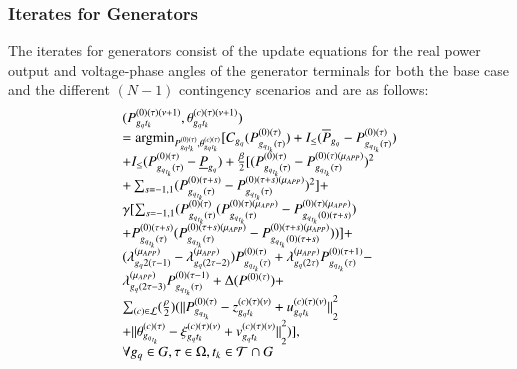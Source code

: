 \documentclass[preprint,12pt,3p]{elsarticle}
\begin{document}
	\subsubsection{Iterates for Generators}The iterates for generators consist of the update equations for the real power output and voltage-phase angles of the generator terminals for both the base case and the different $(N-1)$ contingency scenarios and are as follows:
	\begin{equation}\label{ADMM_Lookahead_Demand_Gen}
	\begin{array}{ll}
	(P_{{g_q}{t_k}}^{(0)(\tau)(\nu+1)},\theta_{{g_q}{t_k}}^{(c)(\tau)(\nu+1)})\\=\mbox{argmin}_{P_{{g_q}{t_k}}^{(0)(\tau)},\theta_{{g_q}{t_k}}^{(c)(\tau)}}[C_{g_q}({P}_{{g_q}_{t_k}(\tau)}^{(0)(\tau)})+I_{\leq}(\overline{P}_{g_q}-{P}_{{g_q}_{t_k}(\tau)}^{(0)(\tau)})
	\notag\\+I_{\leq}({P}_{{g_q}_{t_k}(\tau)}^{(0)(\tau)}-\underline{P}_{g_q})+\frac{\beta}{2}[({P}_{{g_q}_{t_k}(\tau)}^{(0)(\tau)}-{P}_{{g_q}_{t_k}(\tau)}^{(0)(\tau)(\mu_{APP})})^2\notag\\+\sum_{s=-1,1}({P}_{{g_q}_{t_k}(\tau)}^{(0)(\tau+s)}-{P}_{{g_q}_{t_k}(\tau)}^{(0)(\tau+s)(\mu_{APP})})^2]+\notag\\\gamma[\sum_{s=-1,1}({P}_{{g_q}_{t_k}(\tau)}^{(0)(\tau)}({P}_{{g_q}_{t_k}(\tau)}^{(0)(\tau)(\mu_{APP})}-{P}_{{g_q}_{t_k}(0)(\tau+s)}^{(0)(\tau)(\mu_{APP})})\notag\\+{P}_{{g_q}_{t_k}(\tau)}^{(0)(\tau+s)}({P}_{{g_q}_{t_k}(\tau)}^{(0)(\tau+s)(\mu_{APP})}-{P}_{{g_q}_{t_k}(0)(\tau+s)}^{(0)(\tau+s)(\mu_{APP})}))]+\notag\\(\lambda_{{g_q}2(\tau-1)}^{(\mu_{APP})}-\lambda_{{g_q}(2\tau-2)}^{(\mu_{APP})}){P}_{{g_q}_{t_k}(\tau)}^{(0)(\tau)}+\lambda_{{g_q}(2\tau)}^{(\mu_{APP})}{P}_{{g_q}_{t_k}(\tau)}^{(0)(\tau+1)}-\notag\\\lambda_{{g_q}(2\tau-3)}^{(\mu_{APP})}{P}_{{g_q}_{t_k}(\tau)}^{(0)(\tau-1)}+\Delta(P^{(0)(\tau)})+\notag\\
	\sum_{(c)\in\mathcal{L}}(\frac{\rho}{2})({||P_{{g_q}_{t_k}}^{(0)(\tau)}-z_{{g_q}{t_k}}^{(c)(\tau)(\nu)}+u_{{g_q}{t_k}}^{(c)(\tau)(\nu)}||}_{2}^{2}\\+{||\theta_{{g_q}_{t_k}}^{(c)(\tau)}-\xi_{{g_q}{t_k}}^{(c)(\tau)(\nu)}+v_{{g_q}{t_k}}^{(c)(\tau)(\nu)}||}_{2}^{2})],\\
	\forall g_q\in G, \tau\in\Omega,t_k\in\mathcal{T}\cap G
	\end{array}
	\end{equation}
\end{document}
